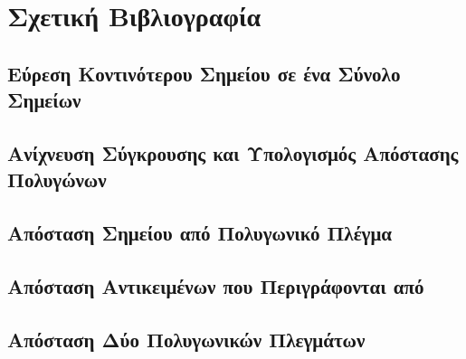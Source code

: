 \chapter{Σχετική Βιβλιογραφία}
\label{ch:related_work}

\section{Εύρεση Κοντινότερου Σημείου σε ένα Σύνολο Σημείων}

\section{Ανίχνευση Σύγκρουσης και Υπολογισμός Απόστασης Πολυγώνων}

\section{Απόσταση Σημείου από Πολυγωνικό Πλέγμα}

\section{Απόσταση Αντικειμένων που Περιγράφονται από }

\section{Απόσταση Δύο Πολυγωνικών Πλεγμάτων}